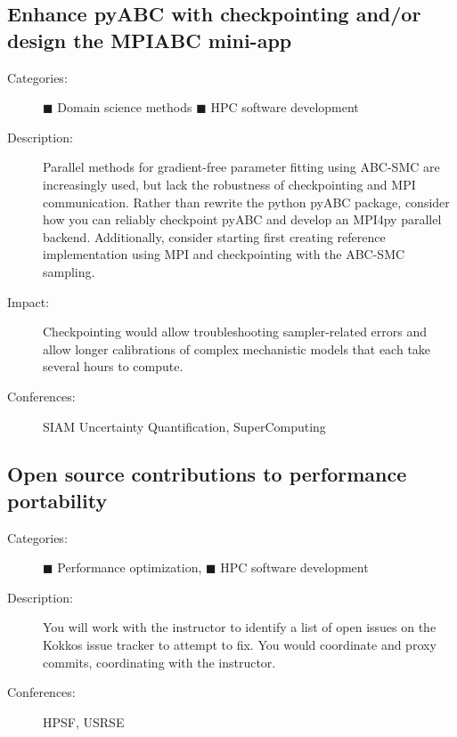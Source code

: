 \documentclass[12pt]{article}
\begin{document}
\subsection{Enhance pyABC with checkpointing and/or design the MPIABC mini-app}
\begin{description}
\item[Categories:]
  \textcolor{green!50!black}{$\blacksquare$} Domain science methods
  \textcolor{blue!80!black}{$\blacksquare$} HPC software development
\item[Description:] Parallel methods for gradient-free parameter fitting %
  using ABC-SMC are increasingly used, %
  but lack the robustness of checkpointing and MPI communication.
  Rather than rewrite the python pyABC package, %
  consider how you can reliably checkpoint pyABC %
  and develop an MPI4py parallel backend.
  Additionally, %
  consider starting first creating reference implementation %
  using MPI and checkpointing with the ABC-SMC sampling.
\item[Impact:] Checkpointing would allow troubleshooting %
  sampler-related errors %
  and allow longer calibrations %
  of complex mechanistic models %
  that each take several hours to compute.
\item[Conferences:] SIAM Uncertainty Quantification, SuperComputing
\end{description}

\subsection{Open source contributions to performance portability}
\begin{description}
\item[Categories:]
  \textcolor{orange!90!black}{$\blacksquare$} Performance optimization,
  \textcolor{blue!80!black}{$\blacksquare$} HPC software development
\item[Description:] You will work with the instructor %
  to identify a list of open issues on the Kokkos issue tracker %
  to attempt to fix.
  You would coordinate and proxy commits, %
  coordinating with the instructor.
\item[Conferences:] HPSF, USRSE
\end{description}
\end{document}
